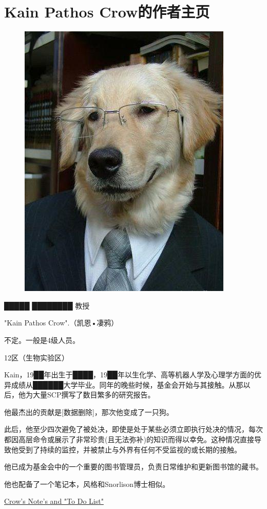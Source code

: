 \chapter{Kain Pathos Crow的作者主页}

\label{chap:AUTHOR-kain-pathos-crow}

\begin{figure}[H]
	\centering
	\includegraphics[width=0.5\linewidth]{images/AUTHOR-kain-pathos-crow.jpg}
	\caption*{\textsuperscript{}}
\end{figure}

█████ ████████ 教授

"Kain Pathos Crow".（凯恩•凄鸦）

不定。一般是4级人员。

12区（生物实验区）

Kain，19██年出生于████，19██年以生化学、高等机器人学及心理学方面的优异成绩从██████大学毕业。同年的晚些时候，基金会开始与其接触。从那以后，他为大量SCP撰写了数目繁多的研究报告。

他最杰出的贡献是{[}数据删除]，那次他变成了一只狗。

此后，他至少四次避免了被处决，即使是处于某些必须立即执行处决的情况，每次都因高层命令或展示了非常珍贵(且无法弥补)的知识而得以幸免。这种情况直接导致他受到了持续的监控，并被禁止与外界有任何不受监视的或长期的接触。

他已成为基金会中的一个重要的图书管理员，负责日常维护和更新图书馆的藏书。

他也配备了一个笔记本，风格和Snorlison博士相似。

\hyperref[chap:]{Crow's Note's and "To Do List"}

